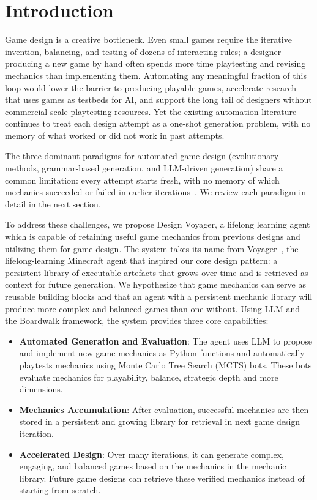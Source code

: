 \documentclass[conference]{IEEEtran}
\begin{document}
\section{Introduction}
Game design is a creative bottleneck. Even small games require the iterative invention, balancing, and testing of dozens of interacting rules; a designer producing a new game by hand often spends more time playtesting and revising mechanics than implementing them. Automating any meaningful fraction of this loop would lower the barrier to producing playable games, accelerate research that uses games as testbeds for AI, and support the long tail of designers without commercial-scale playtesting resources. Yet the existing automation literature continues to treat each design attempt as a one-shot generation problem, with no memory of what worked or did not work in past attempts.

The three dominant paradigms for automated game design (evolutionary methods, grammar-based generation, and LLM-driven generation) share a common limitation: every attempt starts fresh, with no memory of which mechanics succeeded or failed in earlier iterations~\cite{maleki2024procedural,todd2024gavel,piette2019ludii,becker2025boardwalk}. We review each paradigm in detail in the next section.

To address these challenges, we propose Design Voyager, a lifelong learning agent which is capable of retaining useful game mechanics from previous designs and utilizing them for game design. The system takes its name from Voyager~\cite{wang2023voyager}, the lifelong-learning Minecraft agent that inspired our core design pattern: a persistent library of executable artefacts that grows over time and is retrieved as context for future generation. We hypothesize that game mechanics can serve as reusable building blocks and that an agent with a persistent mechanic library will produce more complex and balanced games than one without. Using LLM and the Boardwalk framework, the system provides three core capabilities:
\begin{itemize}
    \item \textbf{Automated Generation and Evaluation}: The agent uses LLM to propose and implement new game mechanics as Python functions and automatically playtests mechanics using Monte Carlo Tree Search (MCTS) bots. These bots evaluate mechanics for playability, balance, strategic depth and more dimensions.
    \item \textbf{Mechanics Accumulation}: After evaluation, successful mechanics are then stored in a persistent and growing library for retrieval in next game design iteration.
    \item \textbf{Accelerated Design}: Over many iterations, it can generate complex, engaging, and balanced games based on the mechanics in the mechanic library. Future game designs can retrieve these verified mechanics instead of starting from scratch.
\end{itemize}
\end{document}
